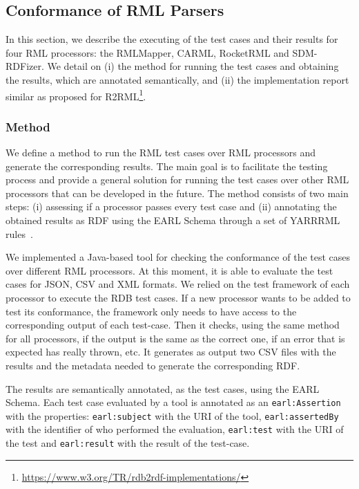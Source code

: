 \subsection{Conformance of RML Parsers}

In this section, we describe the executing of the test cases and their results for four RML processors: the RMLMapper, CARML, RocketRML and SDM-RDFizer. 
We detail on (i) the method for running the test cases and obtaining the results, which are annotated semantically, and (ii) the implementation report similar as proposed for R2RML\footnote{\url{https://www.w3.org/TR/rdb2rdf-implementations/}}. 

\subsubsection{Method}
We define a method to run the RML test cases over RML processors and generate the corresponding results. The main goal is to facilitate the testing process and provide a general solution for running the test cases over other RML processors that can be developed in the future. The method consists of two main steps: (i) assessing if a processor passes every test case and (ii) annotating the obtained results as RDF using the EARL Schema through a set of YARRRML rules~\citep{Heyvaert2018Declarative}.

We implemented a Java-based tool for checking the conformance of the test cases over different RML processors. At this moment, it is able to evaluate the test cases for JSON, CSV and XML formats. We relied on the test framework of each processor to execute the RDB test cases. If a new processor wants to be added to test its conformance, the framework only needs to have access to the corresponding output of each test-case. Then it checks, using the same method for all processors, if the output is the same as the correct one, if an error that is expected has really thrown, etc. It generates as output two CSV files with the results and the metadata needed to generate the corresponding RDF.

The results are semantically annotated, as the test cases, using the EARL Schema. Each test case evaluated by a tool is annotated as an \texttt{earl:Assertion} with the properties: \texttt{earl:subject} with the URI of the tool, \texttt{earl:assertedBy} with the identifier of who performed the evaluation, \texttt{earl:test} with the URI of the test and \texttt{earl:result} with the result of the test-case. 

